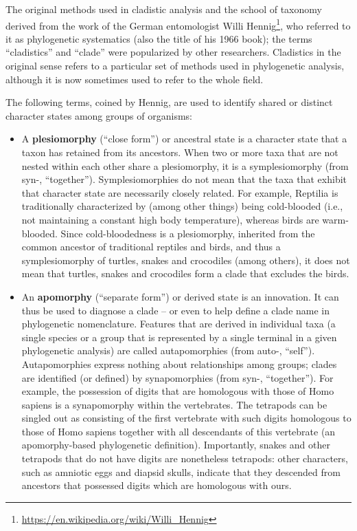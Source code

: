 \documentclass[]{book}
\let\rmarkdownfootnote\footnote%
\def\footnote{\protect\rmarkdownfootnote}
\renewcommand{\href}[2]{#2\footnote{\url{#1}}}
\begin{document}
The original methods used in cladistic analysis and the school of taxonomy derived from the work of the German entomologist \href{https://en.wikipedia.org/wiki/Willi_Hennig}{Willi Hennig}, who referred to it as phylogenetic systematics (also the title of his 1966 book); the terms ``cladistics'' and ``clade'' were popularized by other researchers. Cladistics in the original sense refers to a particular set of methods used in phylogenetic analysis, although it is now sometimes used to refer to the whole field.

The following terms, coined by Hennig, are used to identify shared or distinct character states among groups of organisms:

\begin{itemize}
\item
  A \textbf{plesiomorphy} (``close form'') or ancestral state is a character state that a taxon has retained from its ancestors. When two or more taxa that are not nested within each other share a plesiomorphy, it is a symplesiomorphy (from syn-, ``together''). Symplesiomorphies do not mean that the taxa that exhibit that character state are necessarily closely related. For example, Reptilia is traditionally characterized by (among other things) being cold-blooded (i.e., not maintaining a constant high body temperature), whereas birds are warm-blooded. Since cold-bloodedness is a plesiomorphy, inherited from the common ancestor of traditional reptiles and birds, and thus a symplesiomorphy of turtles, snakes and crocodiles (among others), it does not mean that turtles, snakes and crocodiles form a clade that excludes the birds.
\item
  An \textbf{apomorphy} (``separate form'') or derived state is an innovation. It can thus be used to diagnose a clade -- or even to help define a clade name in phylogenetic nomenclature. Features that are derived in individual taxa (a single species or a group that is represented by a single terminal in a given phylogenetic analysis) are called autapomorphies (from auto-, ``self''). Autapomorphies express nothing about relationships among groups; clades are identified (or defined) by synapomorphies (from syn-, ``together''). For example, the possession of digits that are homologous with those of Homo sapiens is a synapomorphy within the vertebrates. The tetrapods can be singled out as consisting of the first vertebrate with such digits homologous to those of Homo sapiens together with all descendants of this vertebrate (an apomorphy-based phylogenetic definition). Importantly, snakes and other tetrapods that do not have digits are nonetheless tetrapods: other characters, such as amniotic eggs and diapsid skulls, indicate that they descended from ancestors that possessed digits which are homologous with ours.

\end{itemize}
\end{document}
